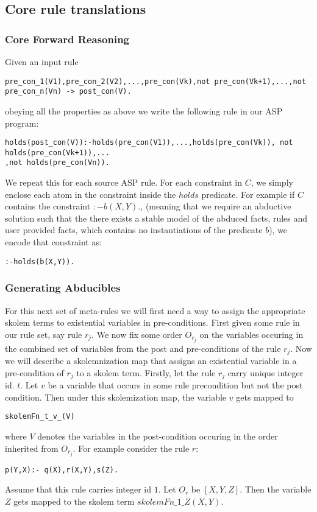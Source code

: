 \documentclass[sigconf]{acmart}
\begin{document}
\subsection{Core rule translations}

\subsubsection{Core Forward Reasoning}
Given an input rule 
\begin{verbatim}
pre_con_1(V1),pre_con_2(V2),...,pre_con(Vk),not pre_con(Vk+1),...,not pre_con_n(Vn) -> post_con(V).
\end{verbatim}
obeying all the properties as above we write the following rule in our ASP program: 

\begin{verbatim}
holds(post_con(V)):-holds(pre_con(V1)),...,holds(pre_con(Vk)), not holds(pre_con(Vk+1)),...
,not holds(pre_con(Vn)). 
\end{verbatim}

We repeat this for each source ASP rule. For each constraint in $C$, we simply
enclose each atom in the constraint inside the $holds$ predicate. For example
if $C$ contains the constraint $:-b(X,Y).$, (meaning that we require an
abductive solution such that the there exists a stable model of the abduced
facts, rules and user provided facts, which contains no instantiations of the
predicate $b$), we encode that constraint as: 
\begin{verbatim}
:-holds(b(X,Y)).
\end{verbatim}

\subsubsection{Generating Abducibles}

For this next set of meta-rules we will first need a way to assign the appropriate skolem terms to existential variables in pre-conditions. First given some rule in our rule set, say rule $r_{j}$. We now fix some order $O_{r_{j}}$ on the variables occuring in the combined set of variables from the post and pre-conditions of the rule $r_{j}$. Now we will describe a skolemnization map that assigns an existential variable in a pre-condition of $r_{j}$ to a skolem term. Firstly, let the rule $r_{j}$ 
carry unique integer id. $t$. Let $v$ be a variable that occurs in some rule precondition but not the post condition. Then under this skolemization map, the variable $v$ gets mapped to 
\begin{verbatim}
skolemFn_t_v_(V)    
\end{verbatim}
where $V$ denotes the variables in the post-condition occuring in the order inherited from $O_{r_{j}}$. For example consider the rule $r$: 
\begin{verbatim}
p(Y,X):- q(X),r(X,Y),s(Z).    
\end{verbatim} 
Assume that this rule carries integer id $1$. Let $O_{r}$ be $[X,Y,Z]$. Then the variable $Z$ gets mapped to the skolem term $skolemFn\_1\_Z(X,Y)$.
\end{document}
